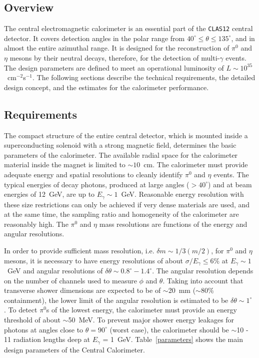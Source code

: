 \subsection{Overview}

The central electromagnetic calorimeter is an essential part of the 
{\tt CLAS12} central detector.  It covers detection angles in the polar 
range from $40^\circ \leq \theta \leq 135^\circ$, and in almost the entire 
azimuthal range.  It is designed for the reconstruction of $\pi^0$ and 
$\eta$ mesons by their neutral decays, therefore, for the detection of 
multi-$\gamma$ events.  The design parameters are defined to meet an 
operational luminosity of $L \sim 10^{35}$~cm$^{-2}$s$^{-1}$.  The following 
sections describe the technical requirements, the detailed design concept, 
and the estimates for the calorimeter performance.

\subsection{Requirements}

The compact structure of the entire central detector, which is mounted 
inside a superconducting solenoid with a strong magnetic field, determines 
the basic parameters of the calorimeter.  The available radial space for 
the calorimeter material inside the magnet is limited to $\sim 10$~cm.  The 
calorimeter must provide adequate energy and spatial resolutions to cleanly 
identify $\pi^0$ and $\eta$ events.  The typical energies of decay photons, 
produced at large angles ($>40^\circ$) and at beam energies of 12~GeV, are 
up to $E_\gamma \sim 1$~GeV.  Reasonable energy resolution with these size 
restrictions can only be achieved if very dense materials are used, and at 
the same time, the sampling ratio and homogeneity of the calorimeter are 
reasonably high. The $\pi^0$ and $\eta$ mass resolutions are functions of 
the energy and angular resolutions.  

In order to provide sufficient mass resolution, i.e. 
$\delta m \sim 1/3(m/2)$, for $\pi^0$ and $\eta$ mesons, it is 
necessary to have energy resolutions of about $\sigma/E_\gamma \leq 6\%$ at 
$E_\gamma \sim 1$~GeV and angular resolutions of 
$\delta \theta \sim 0.8^\circ -1.4^\circ$.  The angular resolution depends 
on the number of channels used to measure $\phi$ and $\theta$. Taking into 
account that transverse shower dimensions are expected to be of  
$\sim$20~mm ($\sim$80\% containment), the lower limit of the angular 
resolution is estimated to be $\delta \theta \sim 1^\circ$ .  To detect 
$\pi^0$s of the lowest energy, the calorimeter must provide an energy 
threshold of about $\sim$50~MeV.  To prevent major shower energy leakages 
for photons at angles close to $\theta = 90^\circ$ (worst case), the 
calorimeter should be  $\sim$10 - 11 radiation lengths deep at 
$E_\gamma$ = 1~GeV.  Table~\ref{parameters} shows the main design parameters 
of the Central Calorimeter.


